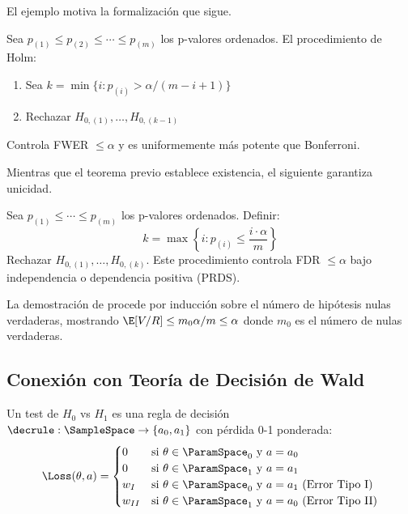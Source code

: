 El ejemplo motiva la formalización que sigue.

\begin{theorem}
	\label{thm:ch4-holm}
	Sea $p_{(1)} \leq p_{(2)} \leq \cdots \leq p_{(m)}$ los p-valores ordenados.
	El procedimiento de Holm:
	\begin{enumerate}
		\item Sea $k = \min\{i : p_{(i)} > \alpha/(m-i+1)\}$
		\item Rechazar $H_{0,(1)}, \ldots, H_{0,(k-1)}$
	\end{enumerate}
	Controla FWER $\leq \alpha$ y es uniformemente más potente que Bonferroni.
\end{theorem}

Mientras que el teorema previo establece existencia, el siguiente garantiza unicidad.

\begin{theorem}
	\label{thm:ch4-bh}
	Sea $p_{(1)} \leq \cdots \leq p_{(m)}$ los p-valores ordenados. Definir:
	\[
		k = \max\left\{i : p_{(i)} \leq \frac{i \cdot \alpha}{m}\right\}
	\]
	Rechazar $H_{0,(1)}, \ldots, H_{0,(k)}$. Este procedimiento controla
	FDR $\leq \alpha$ bajo independencia o dependencia positiva (PRDS).
\end{theorem}

\begin{proofsketch}
	La demostración de \citet{benjamini1995controlling} procede por inducción
	sobre el número de hipótesis nulas verdaderas, mostrando
	$\E[V/R] \leq m_0 \alpha / m \leq \alpha$ donde $m_0$ es el número de
	nulas verdaderas. 
\end{proofsketch}

\subsection{Conexión con Teoría de Decisión de Wald}
\label{sec:ch4-wald}

\begin{proposition}
	\label{prop:ch4-test-decision}
	Un test de $H_0$ vs $H_1$ es una regla de decisión
	$\decrule: \SampleSpace \to \{a_0, a_1\}$ con pérdida 0-1 ponderada:
	\[
		\Loss(\theta, a) = \begin{cases}
			0      & \text{si } \theta \in \ParamSpace_0 \text{ y } a = a_0                         \\
			0      & \text{si } \theta \in \ParamSpace_1 \text{ y } a = a_1                         \\
			w_I    & \text{si } \theta \in \ParamSpace_0 \text{ y } a = a_1 \text{ (Error Tipo I)}  \\
			w_{II} & \text{si } \theta \in \ParamSpace_1 \text{ y } a = a_0 \text{ (Error Tipo II)}
		\end{cases}
	\]
\end{proposition}

